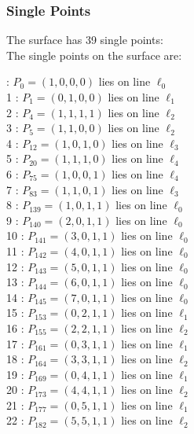 \documentclass{article}
\begin{document}
{\subsubsection*{Single Points}
The surface has 39 single points:\\
The single points on the surface are:\\
\begin{multicols}{2}
 : $P_{0}=( 1, 0, 0, 0 )$ lies on line $\ell_{0}$\\
1 : $P_{1}=( 0, 1, 0, 0 )$ lies on line $\ell_{1}$\\
2 : $P_{4}=( 1, 1, 1, 1 )$ lies on line $\ell_{2}$\\
3 : $P_{5}=( 1, 1, 0, 0 )$ lies on line $\ell_{2}$\\
4 : $P_{12}=( 1, 0, 1, 0 )$ lies on line $\ell_{3}$\\
5 : $P_{20}=( 1, 1, 1, 0 )$ lies on line $\ell_{4}$\\
6 : $P_{75}=( 1, 0, 0, 1 )$ lies on line $\ell_{4}$\\
7 : $P_{83}=( 1, 1, 0, 1 )$ lies on line $\ell_{3}$\\
8 : $P_{139}=( 1, 0, 1, 1 )$ lies on line $\ell_{0}$\\
9 : $P_{140}=( 2, 0, 1, 1 )$ lies on line $\ell_{0}$\\
10 : $P_{141}=( 3, 0, 1, 1 )$ lies on line $\ell_{0}$\\
11 : $P_{142}=( 4, 0, 1, 1 )$ lies on line $\ell_{0}$\\
12 : $P_{143}=( 5, 0, 1, 1 )$ lies on line $\ell_{0}$\\
13 : $P_{144}=( 6, 0, 1, 1 )$ lies on line $\ell_{0}$\\
14 : $P_{145}=( 7, 0, 1, 1 )$ lies on line $\ell_{0}$\\
15 : $P_{153}=( 0, 2, 1, 1 )$ lies on line $\ell_{1}$\\
16 : $P_{155}=( 2, 2, 1, 1 )$ lies on line $\ell_{2}$\\
17 : $P_{161}=( 0, 3, 1, 1 )$ lies on line $\ell_{1}$\\
18 : $P_{164}=( 3, 3, 1, 1 )$ lies on line $\ell_{2}$\\
19 : $P_{169}=( 0, 4, 1, 1 )$ lies on line $\ell_{1}$\\
20 : $P_{173}=( 4, 4, 1, 1 )$ lies on line $\ell_{2}$\\
21 : $P_{177}=( 0, 5, 1, 1 )$ lies on line $\ell_{1}$\\
22 : $P_{182}=( 5, 5, 1, 1 )$ lies on line $\ell_{2}$\\

\end{multicols}}
\end{document}
